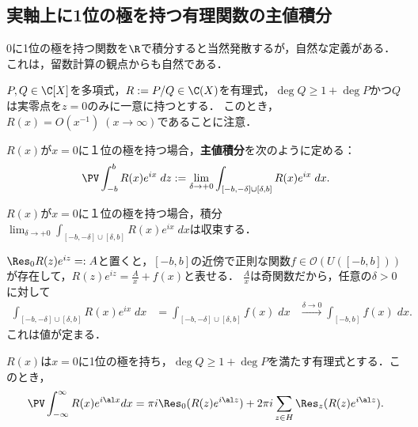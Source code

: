 \documentclass[uplatex, dvipdfmx]{jsreport}
\begin{document}
\subsection{実軸上に1位の極を持つ有理関数の主値積分}

\begin{tcolorbox}[colframe=ForestGreen, colback=ForestGreen!10!white,breakable,colbacktitle=ForestGreen!40!white,coltitle=black,fonttitle=\bfseries\sffamily,
title=]
    $0$に1位の極を持つ関数を$\R$で積分すると当然発散するが，自然な定義がある．
    これは，留数計算の観点からも自然である．
\end{tcolorbox}

\begin{notation}
    $P,Q\in\C[X]$を多項式，$R:=P/Q\in\C(X)$を有理式，$\deg Q\ge 1+\deg P$かつ$Q$は実零点を$z=0$のみに一意に持つとする．
    このとき，$R(x)=O(x^{-1})\;(x\to\infty)$であることに注意．
\end{notation}

\begin{definition}
    $R(x)$が$x=0$に１位の極を持つ場合，\textbf{主値積分}を次のように定める：
    \[\PV\int^b_{-b}R(x)e^{ix}\;dz:=\lim_{\delta\to+0}\int_{[-b,-\delta]\cup[\delta,b]}R(x)e^{ix}\;dx.\]
\end{definition}

\begin{lemma}
    $R(x)$が$x=0$に１位の極を持つ場合，積分$\lim_{\delta\to+0}\int_{[-b,-\delta]\cup[\delta,b]}R(x)e^{ix}\;dx$は収束する．
\end{lemma}
\begin{Proof}
    $\Res_0R(z)e^{iz}=:A$と置くと，$[-b,b]$の近傍で正則な関数$f\in\mathcal{O}(U([-b,b]))$が存在して，$R(z)e^{iz}=\frac{A}{x}+f(x)$と表せる．
    $\frac{A}{x}$は奇関数だから，任意の$\delta>0$に対して
    \begin{align*}
        \int_{[-b,-\delta]\cup[\delta,b]}R(x)e^{ix}\;dx&=\int_{[-b,-\delta]\cup[\delta,b]}f(x)\;dx
        &\xrightarrow{\delta\to 0}\int_{[-b,b]}f(x)\;dx.
    \end{align*}
    これは値が定まる．
\end{Proof}

\begin{proposition}[積分路上にある留数はその半分を取る]
    $R(x)$は$x=0$に1位の極を持ち，$\deg Q\ge 1+\deg P$を満たす有理式とする．このとき，
    \[\PV\int^\infty_{-\infty}R(x)e^{i\al x}dx=\pi i\Res_0(R(z)e^{i\al z})+2\pi i\sum_{z\in H}\Res_z(R(z)e^{i\al z}).\]
\end{proposition}
\end{document}
